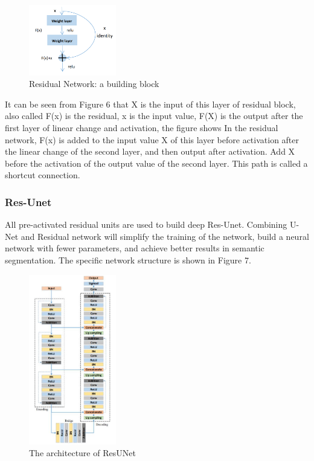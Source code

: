 \documentclass{article}
\begin{document}
\begin{figure}[H]
    \centering
    \includegraphics[width = 1.5in]{Residual Network}
    \caption{Residual Network: a building block}
    \label{Residual Network: a building block}
\end{figure}

It can be seen from Figure 6 that X is the input of this layer of residual block, also called F(x) is the residual, x is the input value, F(X) is the output after the first layer of linear change and activation, the figure shows In the residual network, F(x) is added to the input value X of this layer before activation after the linear change of the second layer, and then output after activation. Add X before the activation of the output value of the second layer. This path is called a shortcut connection.
\subsubsection{Res-Unet}
All pre-activated residual units are used to build deep Res-Unet. Combining U-Net and Residual network will simplify the training of the network, build a neural network with fewer parameters, and achieve better results in semantic segmentation. The specific network structure is shown in Figure 7.\cite{zhang2018road}

\begin{figure}[H]
    \centering
    \includegraphics[width = 1.5in]{architecture of ResUNet}
    \caption{The architecture of ResUNet}
    \label{The architecture of ResUNet}
\end{figure}
\end{document}

